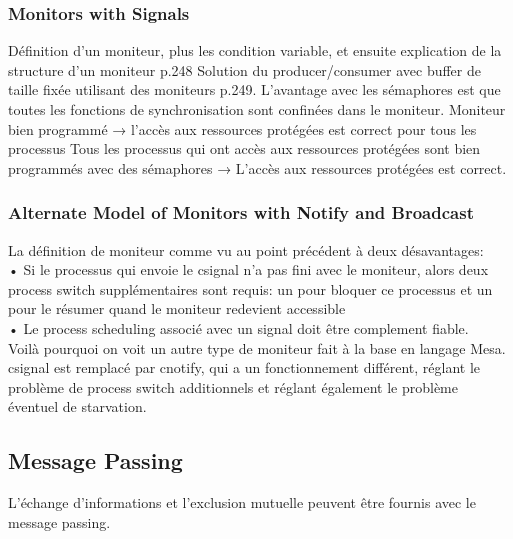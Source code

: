 \subsubsection{Monitors with Signals}
Définition d’un moniteur, plus les condition variable, et ensuite explication de la structure d’un moniteur p.248
Solution du producer/consumer avec buffer de taille fixée utilisant des moniteurs p.249.
L’avantage avec les sémaphores est que toutes les fonctions de synchronisation sont confinées dans le moniteur.
Moniteur bien programmé → l’accès aux ressources protégées est correct pour tous les processus
Tous les processus qui ont accès aux ressources protégées sont bien programmés avec des sémaphores → L’accès aux ressources protégées est correct.
\subsubsection{Alternate Model of Monitors with Notify and Broadcast}
La définition de moniteur comme vu au point précédent à deux désavantages: \\
• Si le processus qui envoie le csignal n’a pas fini avec le moniteur, alors deux process switch supplémentaires sont requis: un pour bloquer ce processus et un pour le résumer quand le moniteur redevient accessible \\
• Le process scheduling associé avec un signal doit être complement fiable. \\
Voilà pourquoi on voit un autre type de moniteur fait à la base en langage Mesa. csignal est remplacé par cnotify, qui a un fonctionnement différent, réglant le problème de process switch additionnels et réglant également le problème éventuel de starvation.
\subsection{Message Passing}
L’échange d’informations et l’exclusion mutuelle peuvent être fournis avec le message passing.

